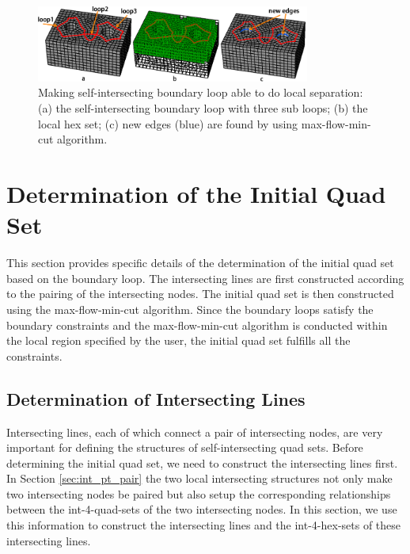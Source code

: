 \documentclass[final,5p,times,twocolumn]{elsarticle}
\begin{document}
\begin{figure}[htbp]
\begin{center}
\includegraphics[width=9cm]{int_loop_local_sep.png}
\caption{Making self-intersecting boundary loop able to do local separation: (a) the self-intersecting boundary loop with three sub loops; (b) the local hex set; (c) new edges (blue) are found by using max-flow-min-cut algorithm.}
\label{fig:int_loop_local_sep}
\end{center}
\end{figure}

\section{Determination of the Initial Quad Set}
\label{sec:det_quad_set}
This section provides specific details of the determination of the initial quad set based on the boundary loop. The intersecting lines are first constructed according to the pairing of the intersecting nodes. The initial quad set is then constructed using the max-flow-min-cut algorithm. Since the boundary loops satisfy the boundary constraints and the max-flow-min-cut algorithm is conducted within the local region specified by the user, the initial quad set fulfills all the constraints.

\subsection{Determination of Intersecting Lines}
\label{sec:det_int_lines}
Intersecting lines, each of which connect a pair of intersecting nodes, are very important for defining the structures of self-intersecting quad sets. Before determining the initial quad set, we need to construct the intersecting lines first. In Section \ref{sec:int_pt_pair} the two local intersecting structures not only make two intersecting nodes be paired but also setup the corresponding relationships between the int-4-quad-sets of the two intersecting nodes. In this section, we use this information to construct the intersecting lines and the int-4-hex-sets of these intersecting lines.
\end{document}
